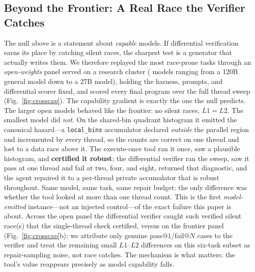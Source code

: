 \subsection{Beyond the Frontier: A Real Race the Verifier Catches}
\label{sec:crosscap}
The null above is a statement about \emph{capable} models. If differential
verification earns its place by catching silent races, the sharpest test is a
generator that actually writes them. We therefore replayed the \NraceTasks{}
most race-prone tasks through an \emph{open-weights} panel served on a
research cluster (\NopenModels{} models ranging from a 120B general model down to a
27B model), holding the harness, prompts, and differential scorer fixed, and
scored every final program over the full thread sweep
(Fig.~\ref{fig:crosscap}). The capability gradient is exactly the one the null
predicts. The larger open models behaved like the frontier: no silent races,
$L1\!=\!L2$. The smallest model did \emph{not}. On the shared-bin quadrant
histogram it emitted the canonical hazard---a \texttt{local\_bins} accumulator
declared \emph{outside} the parallel region and incremented by every thread, so
the counts are correct on one thread and lost to a data race above it. The
execute-once tool ran it once, saw a plausible histogram, and \textbf{certified
it robust}; the differential verifier ran the sweep, saw it pass at one thread
and fail at two, four, and eight, returned that diagnostic, and the agent
repaired it to a per-thread private accumulator that is robust throughout. Same
model, same task, same repair budget: the only difference was whether the tool
looked at more than one thread count. This is the first \emph{model-emitted}
instance---not an injected control---of the exact failure this paper is about.
Across the open panel the differential verifier caught \NopenRescued{} such
verified silent race(s) that the single-thread check certified, versus
\NfrontierRaces{} on the frontier panel (Fig.~\ref{fig:crosscap}b); we attribute
only genuine pass$@1$/fail$@N$ cases to the verifier and treat the remaining small
$L1$--$L2$ differences on this six-task subset as repair-sampling noise, not race
catches. The mechanism is what matters: the tool's value reappears precisely as
model capability falls.

